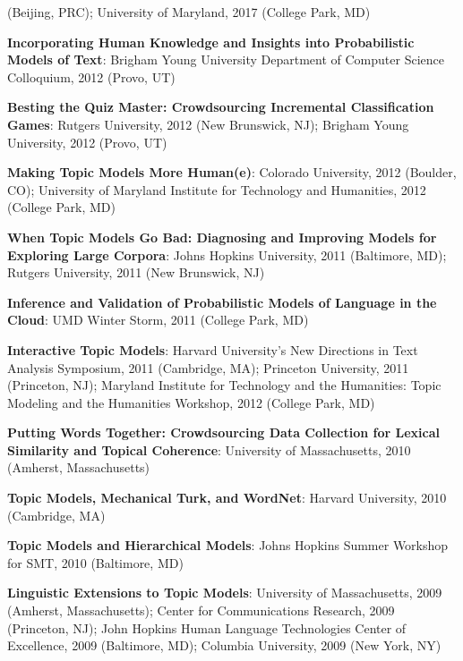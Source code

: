 {{\begin{enumerate*}
          (Beijing, PRC); University of Maryland, 2017 (College Park,
          MD)
	\item {\bf Incorporating Human Knowledge and Insights into Probabilistic Models of Text}: Brigham Young University Department of Computer Science Colloquium, 2012 (Provo, UT)
	\item {\bf Besting the Quiz Master: Crowdsourcing Incremental Classification Games}: Rutgers University, 2012 (New Brunswick, NJ); Brigham Young University, 2012 (Provo, UT)
	\item {\bf Making Topic Models More Human(e)}: Colorado University, 2012 (Boulder, CO); University of Maryland Institute for Technology and Humanities, 2012 (College Park, MD)
	\item {\bf When Topic Models Go Bad: Diagnosing and Improving Models for Exploring Large Corpora}: Johns Hopkins University, 2011 (Baltimore, MD); Rutgers University, 2011 (New Brunswick, NJ)
	\item {\bf Inference and Validation of Probabilistic Models of Language in the Cloud}: UMD Winter Storm, 2011 (College Park, MD)
	\item {\bf Interactive Topic Models}: Harvard University's New
          Directions in Text Analysis Symposium, 2011 (Cambridge, MA);
          Princeton University, 2011 (Princeton, NJ); Maryland
          Institute for Technology and the Humanities: Topic Modeling
          and the Humanities Workshop, 2012 (College Park, MD)
	\item {\bf Putting Words Together: Crowdsourcing Data Collection for Lexical Similarity and Topical Coherence}: University of Massachusetts, 2010 (Amherst, Massachusetts)
	\item {\bf Topic Models, Mechanical Turk, and WordNet}: Harvard University, 2010 (Cambridge, MA)
	\item {\bf Topic Models and Hierarchical Models}: Johns Hopkins Summer Workshop for SMT, 2010 (Baltimore, MD)
	\item {\bf Linguistic Extensions to Topic Models}: University of
          Massachusetts, 2009 (Amherst, Massachusetts); Center for
          Communications Research, 2009 (Princeton, NJ); John Hopkins Human
          Language Technologies Center of Excellence, 2009 (Baltimore, MD); Columbia University, 2009 (New York, NY)
\end{enumerate*}


}
}



\ifumd
\else
{}
\fi

